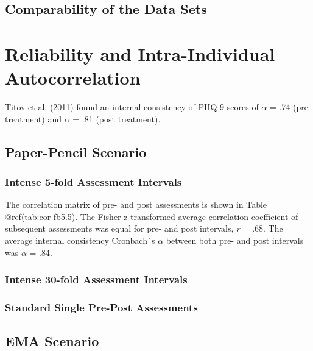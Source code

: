 \documentclass[12pt,twoside]{reedthesis}
\begin{document}
\hypertarget{comparability-of-the-data-sets}{%
\subsection{Comparability of the Data Sets}\label{comparability-of-the-data-sets}}

\hypertarget{reliability}{%
\section{Reliability and Intra-Individual Autocorrelation}\label{reliability}}

Titov et al. (2011) found an internal consistency of PHQ-9 scores of \(\alpha\) = .74 (pre treatment) and \(\alpha\) = .81 (post treatment).

\hypertarget{paper-pencil-scenario}{%
\subsection{Paper-Pencil Scenario}\label{paper-pencil-scenario}}

\hypertarget{intense-5-fold-assessment-intervals}{%
\subsubsection{Intense 5-fold Assessment Intervals}\label{intense-5-fold-assessment-intervals}}

The correlation matrix of pre- and post assessments is shown in Table @ref(tab:cor-fb5.5). The Fisher-z transformed average correlation coefficient of subsequent assessments was equal for pre- and post intervals, \emph{r} = .68. The average internal consistency Cronbach´s \(\alpha\) between both pre- and post intervals was \(\alpha\) = .84.

\hypertarget{intense-30-fold-assessment-intervals}{%
\subsubsection{Intense 30-fold Assessment Intervals}\label{intense-30-fold-assessment-intervals}}

\hypertarget{standard-single-pre-post-assessments}{%
\subsubsection{Standard Single Pre-Post Assessments}\label{standard-single-pre-post-assessments}}

\hypertarget{ema-scenario}{%
\subsection{EMA Scenario}\label{ema-scenario}}
\end{document}
